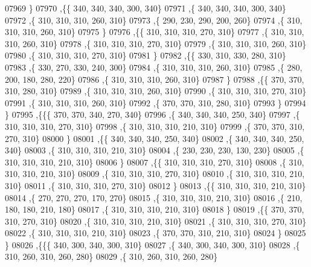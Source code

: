 \begin{DoxyCode}
07969     \}
07970    ,\{\{   340,   340,   340,   300,   340\}
07971     ,\{   340,   340,   340,   300,   340\}
07972     ,\{   310,   310,   310,   260,   310\}
07973     ,\{   290,   230,   290,   200,   260\}
07974     ,\{   310,   310,   310,   260,   310\}
07975     \}
07976    ,\{\{   310,   310,   310,   270,   310\}
07977     ,\{   310,   310,   310,   260,   310\}
07978     ,\{   310,   310,   310,   270,   310\}
07979     ,\{   310,   310,   310,   260,   310\}
07980     ,\{   310,   310,   310,   270,   310\}
07981     \}
07982    ,\{\{   330,   310,   330,   280,   310\}
07983     ,\{   330,   270,   330,   240,   300\}
07984     ,\{   310,   310,   310,   260,   310\}
07985     ,\{   280,   200,   180,   280,   220\}
07986     ,\{   310,   310,   310,   260,   310\}
07987     \}
07988    ,\{\{   370,   370,   310,   280,   310\}
07989     ,\{   310,   310,   310,   260,   310\}
07990     ,\{   310,   310,   310,   270,   310\}
07991     ,\{   310,   310,   310,   260,   310\}
07992     ,\{   370,   370,   310,   280,   310\}
07993     \}
07994    \}
07995   ,\{\{\{   370,   370,   340,   270,   340\}
07996     ,\{   340,   340,   340,   250,   340\}
07997     ,\{   310,   310,   310,   270,   310\}
07998     ,\{   310,   310,   310,   210,   310\}
07999     ,\{   370,   370,   310,   270,   310\}
08000     \}
08001    ,\{\{   340,   340,   340,   250,   340\}
08002     ,\{   340,   340,   340,   250,   340\}
08003     ,\{   310,   310,   310,   210,   310\}
08004     ,\{   230,   230,   230,   130,   230\}
08005     ,\{   310,   310,   310,   210,   310\}
08006     \}
08007    ,\{\{   310,   310,   310,   270,   310\}
08008     ,\{   310,   310,   310,   210,   310\}
08009     ,\{   310,   310,   310,   270,   310\}
08010     ,\{   310,   310,   310,   210,   310\}
08011     ,\{   310,   310,   310,   270,   310\}
08012     \}
08013    ,\{\{   310,   310,   310,   210,   310\}
08014     ,\{   270,   270,   270,   170,   270\}
08015     ,\{   310,   310,   310,   210,   310\}
08016     ,\{   210,   180,   180,   210,   180\}
08017     ,\{   310,   310,   310,   210,   310\}
08018     \}
08019    ,\{\{   370,   370,   310,   270,   310\}
08020     ,\{   310,   310,   310,   210,   310\}
08021     ,\{   310,   310,   310,   270,   310\}
08022     ,\{   310,   310,   310,   210,   310\}
08023     ,\{   370,   370,   310,   210,   310\}
08024     \}
08025    \}
08026   ,\{\{\{   340,   300,   340,   300,   310\}
08027     ,\{   340,   300,   340,   300,   310\}
08028     ,\{   310,   260,   310,   260,   280\}
08029     ,\{   310,   260,   310,   260,   280\}

\end{DoxyCode}
